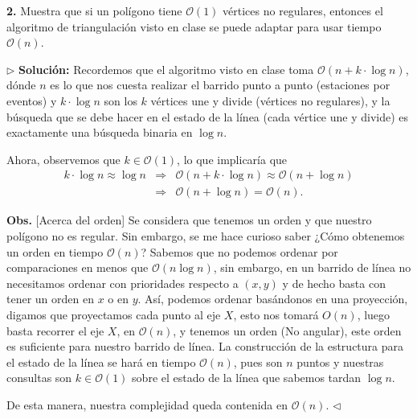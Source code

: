 \textbf{2.} Muestra que si un polígono tiene $\mathcal{O}(1)$ vértices no regulares,
entonces el algoritmo de triangulación visto en clase se puede adaptar para usar tiempo
$\mathcal{O}(n)$. \newline

$\rhd$ \textbf{Solución:} Recordemos que el algoritmo visto en clase toma
$\mathcal{O}(n + k \cdot \log n)$, dónde $n$ es lo que nos cuesta realizar
el barrido punto a punto (estaciones por eventos) y $k \cdot \log n$ son
los $k$ vértices une y divide (vértices no regulares), y la búsqueda que se
debe hacer en el estado de la línea (cada vértice une y divide) es exactamente
una búsqueda binaria en $\log n$.\newline

Ahora, observemos que $k \in \mathcal{O}(1)$, lo que implicaría que
\begin{eqnarray*}
  k \cdot \log n \approx \log n &\Rightarrow& \mathcal{O}(n + k \cdot \log n) \approx \mathcal{O}(n + \log n)\\
  &\Rightarrow&  \mathcal{O}(n + \log n) = \mathcal{O}(n).
\end{eqnarray*}

\textbf{Obs.} [Acerca del orden] Se considera que tenemos un orden y que nuestro polígono
no es regular. Sin embargo, se me hace curioso saber ¿Cómo obtenemos un orden en tiempo
$\mathcal{O}(n)$? Sabemos que no podemos ordenar por comparaciones en menos que
$\mathcal{O}(n\log n)$, sin embargo, en un barrido de línea no necesitamos ordenar con prioridades
respecto a $(x,y)$ y de hecho basta con tener un orden en $x$ o en $y$. Así, podemos ordenar
basándonos en una proyección, digamos que proyectamos cada punto al eje $X$, esto nos tomará
$O(n)$, luego basta recorrer el eje $X$, en $\mathcal{O}(n)$, y tenemos un orden (No angular),
este orden es suficiente para nuestro barrido de línea. La construcción de la estructura para
el estado de la línea se hará en tiempo $\mathcal{O}(n)$, pues son $n$ puntos y nuestras consultas
son $k \in \mathcal{O}(1)$ sobre el estado de la línea que sabemos tardan $\log n$.\newline

De esta manera, nuestra complejidad queda contenida en $\mathcal{O}(n)$.
\hfill $\lhd$
